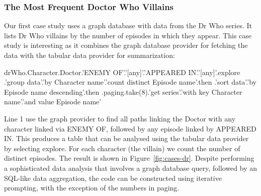\documentclass[manuscript,review,anonymous]{acmart}
\newcommand{\ikvd}[1]{{\fontfamily{zi4}\selectfont\small #1}}
\begin{document}
\subsubsection*{The Most Frequent Doctor Who Villains}
Our first case study uses a graph database with data from the Dr Who series. It lists Dr Who villains
by the number of episodes in which they appear. This case study is interesting as it
combines the graph database provider for fetching the data with the tabular data provider for
summarization:

\begin{thegamma}
drWho.Character.Doctor.'ENEMY OF'.'[any]'.'APPEARED IN'.'[any]'.explore
  .'group data'.'by Character name'.'count distinct Episode name'.then
  .'sort data'.'by Episode name descending'.then
  .paging.take(8).'get series'.'with key Character name'.'and value Episode name'
\end{thegamma}

\noindent
Line 1 use the graph provider to find all paths linking the Doctor with any
character linked via \ikvd{ENEMY OF}, followed by any episode linked by \ikvd{APPEARED IN}.
This produces a table that can be analysed using the tabular data provider by selecting
\ikvd{explore}. For each character (the villain) we count the number of
distinct episodes. The result is shown in Figure~\ref{fig:cases-dr}.
Despite performing a sophisticated data analysis that involves a graph database query,
followed by an SQL-like data aggregation, the code can be constructed using iterative
prompting, with the exception of the numbers in paging.
\end{document}
